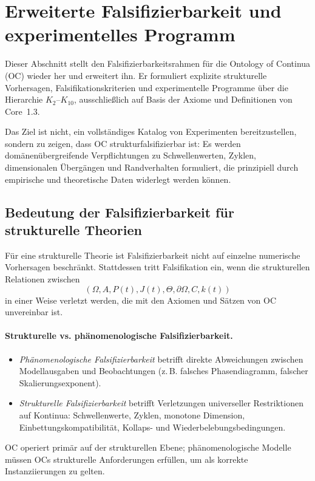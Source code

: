 
\section{Erweiterte Falsifizierbarkeit und experimentelles Programm}
\label{sec:falsifiability-extended}

Dieser Abschnitt stellt den Falsifizierbarkeitsrahmen für die
Ontology of Continua (OC) wieder her und erweitert ihn.
Er formuliert explizite strukturelle Vorhersagen,
Falsifikationskriterien und experimentelle Programme über die Hierarchie
\(K_2\)–\(K_{10}\), ausschließlich auf Basis der Axiome und Definitionen von Core~1.3.

Das Ziel ist nicht, ein vollständiges Katalog von Experimenten bereitzustellen, sondern zu zeigen,
dass OC strukturfalsifizierbar ist: Es werden domänenübergreifende Verpflichtungen zu
Schwellenwerten, Zyklen, dimensionalen Übergängen und Randverhalten formuliert,
die prinzipiell durch empirische und theoretische Daten widerlegt werden können.

\subsection{Bedeutung der Falsifizierbarkeit für strukturelle Theorien}

Für eine strukturelle Theorie ist Falsifizierbarkeit nicht auf einzelne
numerische Vorhersagen beschränkt. Stattdessen tritt Falsifikation ein,
wenn die strukturellen Relationen zwischen
\[
  (\Omega, A, P(t), J(t),
   \Theta, \partial\Omega, C, k(t))
\]
in einer Weise verletzt werden, die mit den Axiomen und Sätzen von OC unvereinbar ist.

\paragraph{Strukturelle vs. phänomenologische Falsifizierbarkeit.}
\begin{itemize}
  \item \emph{Phänomenologische Falsifizierbarkeit} betrifft direkte Abweichungen
        zwischen Modellausgaben und Beobachtungen (z.\,B. falsches Phasendiagramm,
        falscher Skalierungsexponent).
  \item \emph{Strukturelle Falsifizierbarkeit} betrifft Verletzungen universeller
        Restriktionen auf Kontinua: Schwellenwerte, Zyklen, monotone Dimension,
        Einbettungskompatibilität, Kollaps- und Wiederbelebungsbedingungen.
\end{itemize}
OC operiert primär auf der strukturellen Ebene; phänomenologische Modelle müssen
OCs strukturelle Anforderungen erfüllen, um als korrekte Instanziierungen zu gelten.

